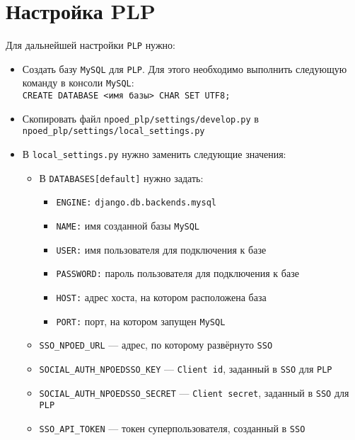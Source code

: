 \section{Настройка PLP}
Для дальнейшей настройки \texttt{PLP} нужно:
\begin{itemize}
	\item Создать базу \texttt{MySQL} для \texttt{PLP}. Для этого необходимо выполнить следующую команду в консоли \texttt{MySQL}:\\
		\texttt{CREATE DATABASE <имя базы> CHAR SET \textquotesingle{}UTF8\textquotesingle{};}
	\item Скопировать файл \texttt{npoed\_plp/settings/develop.py} в\\ \texttt{npoed\_plp/settings/local\_settings.py}
	\item В \texttt{local\_settings.py} нужно заменить следующие значения:
	\begin{itemize}
		\item В \texttt{DATABASES[\textquotesingle{}default\textquotesingle{}]} нужно задать:
		\begin{itemize}
			\item \texttt{\textquotesingle{}ENGINE\textquotesingle{}:} \texttt{\textquotesingle{}django.db.backends.mysql\textquotesingle{}}
			\item \texttt{\textquotesingle{}NAME\textquotesingle{}:} имя созданной базы \texttt{MySQL}
			\item \texttt{\textquotesingle{}USER\textquotesingle{}:} имя пользователя для подключения к базе
			\item \texttt{\textquotesingle{}PASSWORD\textquotesingle{}:} пароль пользователя для подключения к базе
			\item \texttt{\textquotesingle{}HOST\textquotesingle{}:} адрес хоста, на котором расположена база
			\item \texttt{\textquotesingle{}PORT\textquotesingle{}:} порт, на котором запущен \texttt{MySQL}
		\end{itemize}
		\item \texttt{SSO\_NPOED\_URL} --- адрес, по которому развёрнуто \texttt{SSO}
		\item \texttt{SOCIAL\_AUTH\_NPOEDSSO\_KEY} --- \texttt{Client id}, заданный в \texttt{SSO} для \texttt{PLP}
		\item \texttt{SOCIAL\_AUTH\_NPOEDSSO\_SECRET} --- \texttt{Client secret}, заданный в \texttt{SSO} для \texttt{PLP}
		\item \texttt{SSO\_API\_TOKEN} --- токен суперпользователя, созданный в \texttt{SSO}

\end{itemize}
\end{itemize}
